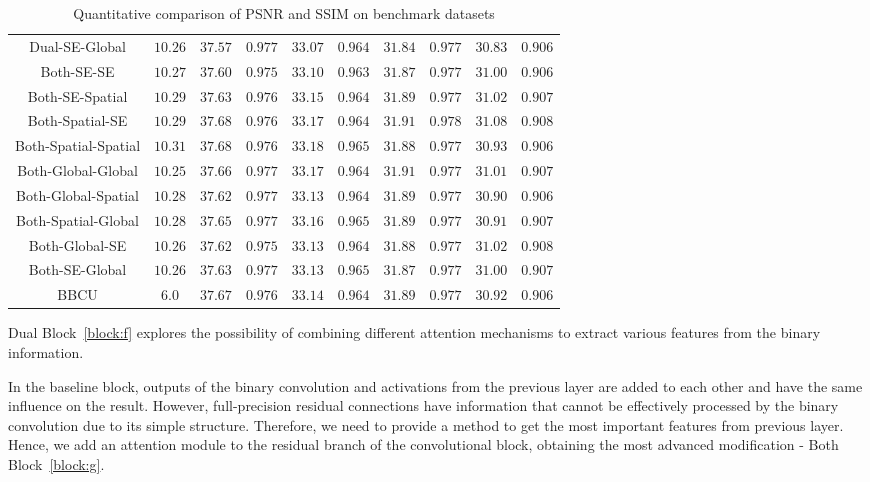 \documentclass{article}
\begin{document}
\begin{table}[t]
\begin{tabular}{ |c|c|c|c|c|c|c|c|c|c| }
        Dual-SE-Global & $10.26$ & $37.57$ & $\mathbf{0.977}$ & $33.07$ & $0.964$ & $31.84$ & $0.977$ & $30.83$ & $0.906$ \\
        Both-SE-SE & $10.27$ & $37.60$ & $0.975$ & $33.10$ & $0.963$ & $31.87$ & $0.977$ & $31.00$ & $0.906$ \\
        Both-SE-Spatial & $10.29$ & $37.63$ & $0.976$ & $33.15$ & $0.964$ & $31.89$ & $0.977$ & $31.02$ & $0.907$ \\
        Both-Spatial-SE & $10.29$ & $\mathbf{37.68}$ & $0.976$ & $33.17$ & $0.964$ & $\mathbf{31.91}$ & $\mathbf{0.978}$ & $\mathbf{31.08}$ & $\mathbf{0.908}$ \\
        Both-Spatial-Spatial & $10.31$ & $\mathbf{37.68}$ & $0.976$ & $\mathbf{33.18}$ & $\mathbf{0.965}$ & $31.88$ & $0.977$ & $30.93$ & $0.906$ \\
        Both-Global-Global & $10.25$ & $37.66$ & $\mathbf{0.977}$ & $33.17$ & $0.964$ & $\mathbf{31.91}$ & $0.977$ & $31.01$ & $0.907$ \\
        Both-Global-Spatial & $10.28$ & $37.62$ & $\mathbf{0.977}$ & $33.13$ & $0.964$ & $31.89$ & $0.977$ & $30.90$ & $0.906$ \\
        Both-Spatial-Global & $10.28$ & $37.65$ & $\mathbf{0.977}$ & $33.16$ & $\mathbf{0.965}$ & $31.89$ & $0.977$ & $30.91$ & $0.907$ \\
        Both-Global-SE & $10.26$ & $37.62$ & $0.975$ & $33.13$ & $0.964$ & $31.88$ & $0.977$ & $31.02$ & $\mathbf{0.908}$ \\
        Both-SE-Global & $10.26$ & $37.63$ & $\mathbf{0.977}$ & $33.13$ & $\mathbf{0.965}$ & $31.87$ & $0.977$ & $31.00$ & $0.907$ \\
        BBCU & $6.0$ & $37.67$ & $0.976$ & $33.14$ & $0.964$ & $31.89$ & $0.977$ & $30.92$ & $0.906$ \\

     \hline
    \end{tabular}
    \caption{Quantitative comparison of PSNR and SSIM on benchmark datasets}
    \label{tab:metric_tab}
\end{table}

Dual Block~\ref{block:f} explores the possibility of combining different attention mechanisms to extract various features from the binary information.

In the baseline block, outputs of the binary convolution and activations from the previous layer are added to each other and have the same influence on the result. However, full-precision residual connections have information that cannot be effectively processed by the binary convolution due to its simple structure. Therefore, we need to provide a method to get the most important features from previous layer. Hence, we add an attention module to the residual branch of the convolutional block, obtaining the most  advanced modification - Both Block~\ref{block:g}.
\end{document}
